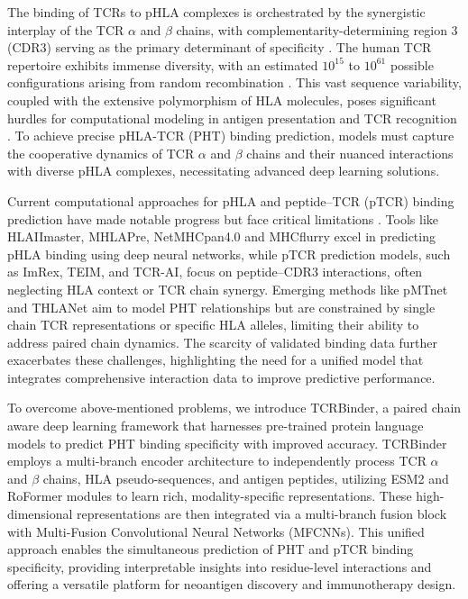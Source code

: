 \documentclass[10pt,letterpaper]{article}
\begin{document}
The binding of TCRs to pHLA complexes is orchestrated by the synergistic interplay of the TCR $\alpha$ and $\beta$ chains, with complementarity-determining region 3 (CDR3) serving as the primary determinant of specificity \cite{ref15,ref16}. The human TCR repertoire exhibits immense diversity, with an estimated $10^{15}$ to $10^{61}$ possible configurations arising from random recombination \cite{ref17,ref18}. This vast sequence variability, coupled with the extensive polymorphism of HLA molecules, poses significant hurdles for computational modeling in antigen presentation and TCR recognition \cite{ref19,ref20}. To achieve precise pHLA-TCR (PHT) binding prediction, models must capture the cooperative dynamics of TCR $\alpha$ and $\beta$ chains and their nuanced interactions with diverse pHLA complexes, necessitating advanced deep learning solutions.


Current computational approaches for pHLA and peptide–TCR (pTCR) binding prediction have made notable progress but face critical limitations \cite{ref21}. Tools like HLAIImaster\cite{ref22}, MHLAPre\cite{ref23}, NetMHCpan4.0\cite{ref24} and MHCflurry\cite{ref25} excel in predicting pHLA binding using deep neural networks, while pTCR prediction models, such as ImRex\cite{ref26}, TEIM\cite{ref27}, and TCR-AI\cite{ref28}, focus on peptide–CDR3 interactions, often neglecting HLA context or TCR chain synergy. Emerging methods like pMTnet\cite{ref29} and THLANet\cite{ref30} aim to model PHT relationships but are constrained by single chain TCR representations or specific HLA alleles, limiting their ability to address paired chain dynamics. The scarcity of validated binding data further exacerbates these challenges, highlighting the need for a unified model that integrates comprehensive interaction data to improve predictive performance.


To overcome above-mentioned problems, we introduce TCRBinder, a paired chain aware deep learning framework that harnesses pre-trained protein language models to predict PHT binding specificity with improved accuracy. TCRBinder employs a multi-branch encoder architecture to independently process TCR $\alpha$ and $\beta$ chains, HLA pseudo-sequences, and antigen peptides, utilizing ESM2 and RoFormer modules to learn rich, modality-specific representations. These high-dimensional representations are then integrated via a multi-branch fusion block with Multi-Fusion Convolutional Neural Networks (MFCNNs). This unified approach enables the simultaneous prediction of PHT and pTCR binding specificity, providing interpretable insights into residue-level interactions and offering a versatile platform for neoantigen discovery and immunotherapy design.
\end{document}
